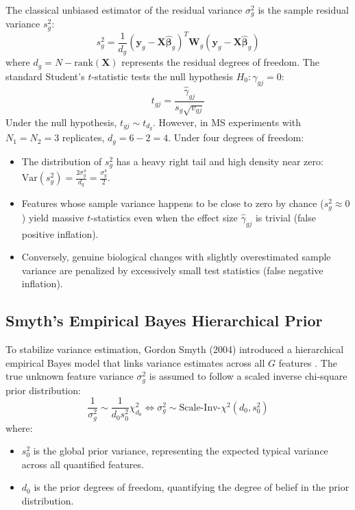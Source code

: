 \documentclass[11pt,twoside,openright]{book}
\begin{document}
The classical unbiased estimator of the residual variance $\sigma_g^2$ is the sample residual variance $s_g^2$:
\begin{equation}
s_g^2 = \frac{1}{d_g} (\mathbf{y}_g - \mathbf{X}\hat{\boldsymbol{\beta}}_g)^T \mathbf{W}_g (\mathbf{y}_g - \mathbf{X}\hat{\boldsymbol{\beta}}_g)
\label{eq:sample_variance}
\end{equation}
where $d_g = N - \text{rank}(\mathbf{X})$ represents the residual degrees of freedom. The standard Student's $t$-statistic tests the null hypothesis $H_0: \gamma_{gj} = 0$:
\begin{equation}
t_{gj} = \frac{\hat{\gamma}_{gj}}{s_g \sqrt{v_{gj}}}
\label{eq:ordinary_t}
\end{equation}
Under the null hypothesis, $t_{gj} \sim t_{d_g}$. However, in MS experiments with $N_1 = N_2 = 3$ replicates, $d_g = 6 - 2 = 4$. Under four degrees of freedom:
\begin{itemize}
    \item The distribution of $s_g^2$ has a heavy right tail and high density near zero: $\text{Var}(s_g^2) = \frac{2 \sigma_g^4}{d_g} = \frac{\sigma_g^4}{2}$.
    \item Features whose sample variance happens to be close to zero by chance ($s_g^2 \approx 0$) yield massive $t$-statistics even when the effect size $\hat{\gamma}_{gj}$ is trivial (false positive inflation).
    \item Conversely, genuine biological changes with slightly overestimated sample variance are penalized by excessively small test statistics (false negative inflation).
\end{itemize}

\subsection{Smyth's Empirical Bayes Hierarchical Prior}

To stabilize variance estimation, Gordon Smyth (2004) introduced a hierarchical empirical Bayes model that links variance estimates across all $G$ features \cite{smyth2004linear}. The true unknown feature variance $\sigma_g^2$ is assumed to follow a scaled inverse chi-square prior distribution:
\begin{equation}
\frac{1}{\sigma_g^2} \sim \frac{1}{d_0 s_0^2} \chi^2_{d_0} \iff \sigma_g^2 \sim \text{Scale-Inv-}\chi^2(d_0, s_0^2)
\label{eq:prior_variance}
\end{equation}
where:
\begin{itemize}
    \item $s_0^2$ is the global prior variance, representing the expected typical variance across all quantified features.
    \item $d_0$ is the prior degrees of freedom, quantifying the degree of belief in the prior distribution.
\end{itemize}
\end{document}
